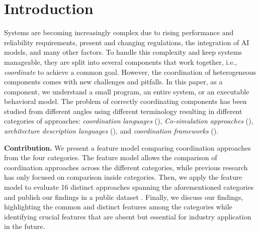 \documentclass[runningheads]{llncs}
\begin{document}
\section{Introduction} \label{sec:introduction}
Systems are becoming increasingly complex due to rising performance and reliability requirements, present and changing regulations, the integration of AI models, and many other factors.
To handle this complexity and keep systems manageable, they are split into several components that work together, i.e., \textit{coordinate} to achieve a common goal.
However, the coordination of heterogeneous components comes with new challenges and pitfalls.
In this paper, as a component, we understand a small program, an entire system, or an executable behavioral model.
The problem of correctly coordinating components has been studied from different angles using different terminology resulting in different categories of approaches: \textit{coordination languages} (\cite{papadopoulosCoordinationModelsLanguages1998}), \textit{Co-simulation approaches} (\cite{gomesCoSimulationSurvey2019}), \textit{architecture description languages} (\cite{clementsSurveyArchitectureDescription1996}), and \textit{coordination frameworks} (\cite{krauterBehavioralConsistencyMultimodeling2023,varalarsenBehavioralCoordinationOperator2015}).

\textbf{Contribution.} We present a feature model comparing coordination approaches from the four categories.
The feature model allows the comparison of coordination approaches across the different categories, while previous research has only focused on comparison inside categories. 
Then, we apply the feature model to evaluate 16 distinct approaches spanning the aforementioned categories and publish our findings in a public dataset \cite{timkrauterArtifactsCoordination2024}.
Finally, we discuss our findings, highlighting the common and distinct features among the categories while identifying crucial features that are absent but essential for industry application in the future.

\end{document}
